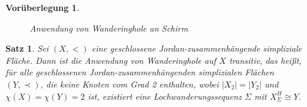 \documentclass[12pt,titlepage,twoside,cleardoublepage]{article}
\theoremstyle{nummermitklammern}
\newtheorem{vor}[temp]{Vorüberlegung}
\newtheorem{satz}[temp]{Satz}
\newtheorem{vor}[zahl]{Vorüberlegung}
\newtheorem{satz}[zahl]{Satz}
\numberwithin{equation}{section}
\begin{document}
\begin{vor}
\begin{figure}[H]
\caption{Anwendung von Wanderinghole an Schirm}
\end{figure}
\end{vor}
\begin{satz} \label{WH}
Sei $(X,<)$ eine geschlossene Jordan-zusammenhängende simpliziale $\,$ Fläche. Dann ist die Anwendung von Wanderinghole auf $X$ transitiv, das heißt, für alle geschlossenen Jordan-zusammenhängenden simplizialen Flächen $(Y,\prec)$, die keine Knoten vom Grad 2 enthalten, wobei $\vert X_2 \vert = \vert Y_2 \vert$ und $\chi(X)=\chi(Y)=2$ ist, existiert eine Lochwanderungssequenz $\Sigma$ mit $X^H_{\Sigma} \cong Y$.
\end{satz}
\end{document}
